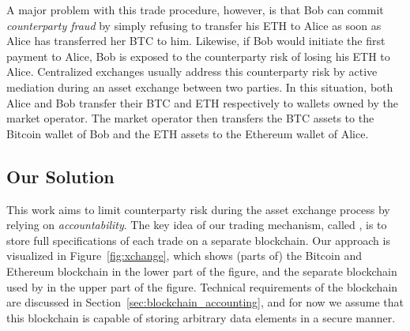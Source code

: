 A major problem with this trade procedure, however, is that Bob can commit \emph{counterparty fraud} by simply refusing to transfer his ETH to Alice as soon as Alice has transferred her BTC to him.
Likewise, if Bob would initiate the first payment to Alice, Bob is exposed to the counterparty risk of losing his ETH to Alice.
Centralized exchanges usually address this counterparty risk by active mediation during an asset exchange between two parties.
In this situation, both Alice and Bob transfer their BTC and ETH respectively to wallets owned by the market operator.
The market operator then transfers the BTC assets to the Bitcoin wallet of Bob and the ETH assets to the Ethereum wallet of Alice.

\subsection{Our Solution}
This work aims to limit counterparty risk during the asset exchange process by relying on \emph{accountability}.
The key idea of our trading mechanism, called \emph{\ModelName{}}, is to store full specifications of each trade on a separate blockchain.
Our approach is visualized in Figure~\ref{fig:xchange}, which shows (parts of) the Bitcoin and Ethereum blockchain in the lower part of the figure, and the separate blockchain used by \emph{\ModelName{}} in the upper part of the figure.
Technical requirements of the \ModelName{} blockchain are discussed in Section~\ref{sec:blockchain_accounting}, and for now we assume that this blockchain is capable of storing arbitrary data elements in a secure manner.

